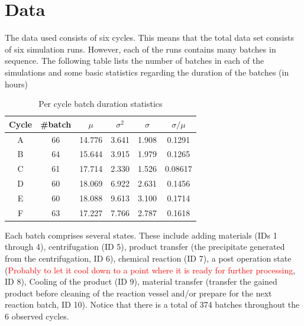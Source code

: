 \documentclass[../Thesis.tex]{subfiles}
\begin{document}
\chapter{Data}


The data used consists of six cycles. This means that the total data set consists of six simulation runs. However, each of the runs contains many batches in sequence. The following table lists the number of batches in each of the simulations and some basic statistics regarding the duration of the batches (in hours)

\begin{table}[h]
    \centering
    \begin{tabular}{c|c|c|c|c|c}
        Cycle & \#batch & $\mu$  & $\sigma^2$ & $\sigma$ & $\sigma / \mu$ \\ \hline
        A     & 66      & 14.776 & 3.641      & 1.908    & 0.1291         \\
        B     & 64      & 15.644 & 3.915      & 1.979    & 0.1265         \\
        C     & 61      & 17.714 & 2.330      & 1.526    & 0.08617        \\
        D     & 60      & 18.069 & 6.922      & 2.631    & 0.1456         \\
        E     & 60      & 18.088 & 9.613      & 3.100    & 0.1714         \\
        F     & 63      & 17.227 & 7.766      & 2.787    & 0.1618
    \end{tabular}
    \caption{Per cycle batch duration statistics}
    \label{tab:cycle basi stats}
\end{table}

Each batch comprises several states. These include adding materials (IDs 1 through 4), centrifugation (ID 5), product transfer (the precipitate generated from the centrifugation, ID 6), chemical reaction (ID 7), a post operation state (\textcolor{red}{Probably to let it cool down to a point where it is ready for further processing}, ID 8), Cooling of the product (ID 9), material transfer (transfer the gained product before cleaning of the reaction vessel and/or prepare for the next reaction batch, ID 10). Notice that there is a total of 374 batches throughout the 6 observed cycles.
\end{document}
